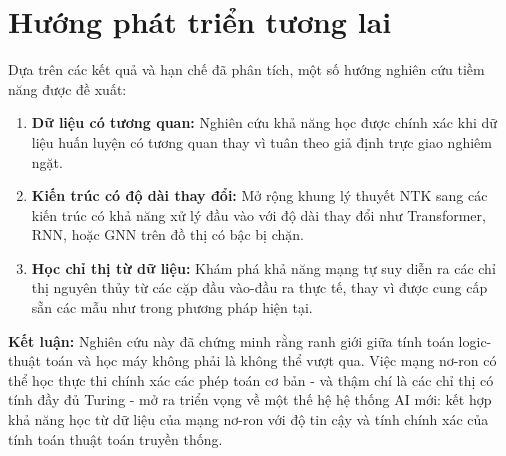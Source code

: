 \section{Hướng phát triển tương lai}

Dựa trên các kết quả và hạn chế đã phân tích, một số hướng nghiên cứu tiềm năng được đề xuất:

\begin{enumerate}
    \item \textbf{Dữ liệu có tương quan:} Nghiên cứu khả năng học được chính xác khi dữ liệu huấn luyện có tương quan thay vì tuân theo giả định trực giao nghiêm ngặt.
    
    \item \textbf{Kiến trúc có độ dài thay đổi:} Mở rộng khung lý thuyết NTK sang các kiến trúc có khả năng xử lý đầu vào với độ dài thay đổi như Transformer, RNN, hoặc GNN trên đồ thị có bậc bị chặn.
    
    \item \textbf{Học chỉ thị từ dữ liệu:} Khám phá khả năng mạng tự suy diễn ra các chỉ thị nguyên thủy từ các cặp đầu vào-đầu ra thực tế, thay vì được cung cấp sẵn các mẫu như trong phương pháp hiện tại.
\end{enumerate}

\vspace{1em}

\textbf{Kết luận:} Nghiên cứu này đã chứng minh rằng ranh giới giữa tính toán logic-thuật toán và học máy không phải là không thể vượt qua. Việc mạng nơ-ron có thể học thực thi chính xác các phép toán cơ bản - và thậm chí là các chỉ thị có tính đầy đủ Turing - mở ra triển vọng về một thế hệ hệ thống AI mới: kết hợp khả năng học từ dữ liệu của mạng nơ-ron với độ tin cậy và tính chính xác của tính toán thuật toán truyền thống.

